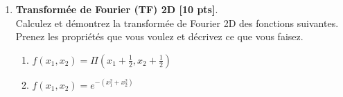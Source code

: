 \documentclass{article}
\begin{document}
\begin{enumerate}
\item {\bf Transformée de Fourier (TF) 2D [10 pts]}. \\
  Calculez et démontrez la
  transformée de Fourier 2D des 
  fonctions suivantes. Prenez les propriétés que vous voulez et
  décrivez ce que vous faisez.  
  \vspace{1cm}    
  \begin{enumerate}
  \item  %
    $f(x_1, x_2) = \Pi( x_1 + \frac{1}{2}, x_2 + \frac{1}{2})$ 
    
    \vspace{1cm}    
  \item $f(x_1, x_2) = e^{-(x_1^2 + x_2^2)}$
  \end{enumerate}
  \vspace{1cm}  

\end{enumerate}
\end{document}
